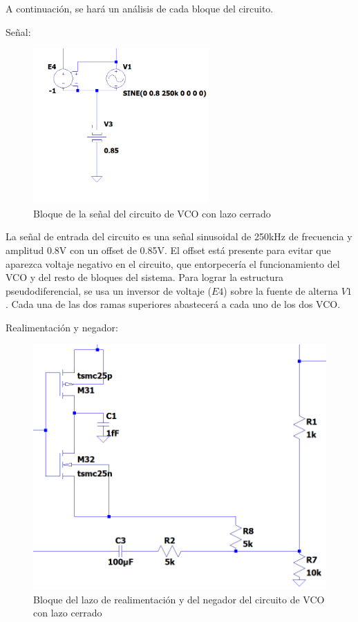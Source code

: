 \documentclass[12pt]{report} %
\begin{document}
	A continuación, se hará un análisis de cada bloque del circuito.
	
	Señal:
	
	\begin{figure}[H]
		\includegraphics[width=0.6\textwidth]{ltspice-vco-closed-signal-block.png}
		\caption[Bloque de la señal del circuito de VCO con lazo cerrado]{Bloque de la señal del circuito de VCO con lazo cerrado}
		\label{fig:ltspice-vco-closed-signal-block.png}
	\end{figure}

	La señal de entrada del circuito es una señal sinusoidal de 250kHz de frecuencia y amplitud 0.8V con un offset de 0.85V. El offset está presente para evitar que aparezca voltaje negativo en el circuito, que entorpecería el funcionamiento del VCO y del resto de bloques del sistema. Para lograr la estructura pseudodiferencial, se usa un inversor de voltaje ($E4$) sobre la fuente de alterna $V1$. Cada una de las dos ramas superiores abastecerá a cada uno de los dos VCO.
	
	Realimentación y negador:
	
	\begin{figure}[H]
		\includegraphics[width=\textwidth]{ltspice-vco-closed-loop-1.png}
		\caption[Bloque del lazo de realimentación y del negador del circuito de VCO con lazo cerrado]{Bloque del lazo de realimentación y del negador del circuito de VCO con lazo cerrado}
		\label{fig:ltspice-vco-closed-loop-1.png}
	\end{figure}
\end{document}
